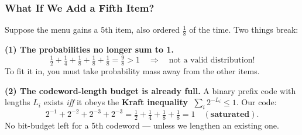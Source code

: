\documentclass[aspectratio=169]{beamer}
\begin{document}
\begin{frame}
\frametitle{What If We Add a Fifth Item?}

\small
Suppose the menu gains a 5th item, also ordered $\tfrac{1}{8}$ of the time. Two things break:

\vspace{0.1cm}
\textbf{(1) The probabilities no longer sum to 1.}
\vspace{-0.15cm}
$$\tfrac{1}{2} + \tfrac{1}{4} + \tfrac{1}{8} + \tfrac{1}{8} + \tfrac{1}{8} = \tfrac{9}{8} > 1 \quad\Rightarrow\quad \text{not a valid distribution!}$$
\vspace{-0.15cm}
To fit it in, you must take probability mass away from the other items.

\pause
\vspace{0.1cm}
\textbf{(2) The codeword-length budget is already full.} A binary prefix code with lengths $L_i$ exists \emph{iff} it obeys the \textbf{Kraft inequality} $\;\sum_i 2^{-L_i} \leq 1$. Our code:
\vspace{-0.1cm}
$$2^{-1} + 2^{-2} + 2^{-3} + 2^{-3} = \tfrac{1}{2}+\tfrac{1}{4}+\tfrac{1}{8}+\tfrac{1}{8} = 1 \quad (\textbf{saturated}).$$
\vspace{-0.15cm}
No bit-budget left for a 5th codeword --- unless we lengthen an existing one.

\pause
\vspace{0.05cm}
\begin{center}
\end{center}
\end{frame}
\end{document}
